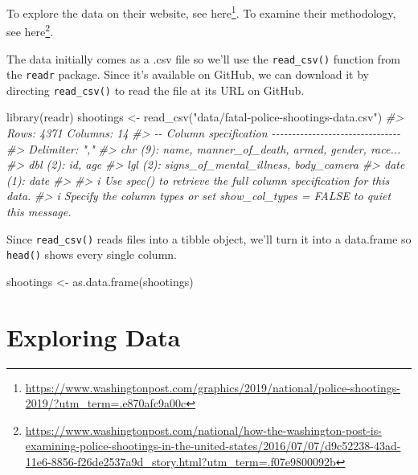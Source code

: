 \documentclass[
]{krantz}
\makeatletter
\newenvironment{Shaded}{\begin{snugshade}}{\end{snugshade}}
\newcommand{\CommentTok}[1]{\textcolor[rgb]{0.37,0.37,0.37}{\textit{#1}}}
\newcommand{\FunctionTok}[1]{\textcolor[rgb]{0,0,0}{#1}}
\newcommand{\NormalTok}[1]{#1}
\newcommand{\OtherTok}[1]{\textcolor[rgb]{0.37,0.37,0.37}{#1}}
\newcommand{\StringTok}[1]{\textcolor[rgb]{0.5,0.5,0.5}{#1}}
\renewcommand{\href}[2]{#2\footnote{\url{#1}}}
\newenvironment{kframe}{%
\medskip{}
\setlength{\fboxsep}{.8em}
 \def\at@end@of@kframe{}%
 \ifinner\ifhmode%
  \def\at@end@of@kframe{\end{minipage}}%
  \begin{minipage}{\columnwidth}%
 \fi\fi%
 \def\FrameCommand##1{\hskip\@totalleftmargin \hskip-\fboxsep
 \colorbox{shadecolor}{##1}\hskip-\fboxsep
     \hskip-\linewidth \hskip-\@totalleftmargin \hskip\columnwidth}%
 \MakeFramed {\advance\hsize-\width
   \@totalleftmargin\z@ \linewidth\hsize
   \@setminipage}}%
 {\par\unskip\endMakeFramed%
 \at@end@of@kframe}
\renewenvironment{Shaded}{\begin{kframe}}{\end{kframe}}
\makeatother
\begin{document}
To explore the data on their website, see \href{https://www.washingtonpost.com/graphics/2019/national/police-shootings-2019/?utm_term=.e870afc9a00c}{here}.
To examine their methodology, see \href{https://www.washingtonpost.com/national/how-the-washington-post-is-examining-police-shootings-in-the-united-states/2016/07/07/d9c52238-43ad-11e6-8856-f26de2537a9d_story.html?utm_term=.f07e9800092b}{here}.

The data initially comes as a .csv file so we'll use the \texttt{read\_csv()} function from the \texttt{readr} package. Since it's available on GitHub, we can download it by directing \texttt{read\_csv()} to read the file at its URL on GitHub.

\begin{Shaded}
\begin{Highlighting}[]
\FunctionTok{library}\NormalTok{(readr)}
\NormalTok{shootings }\OtherTok{\textless{}{-}} \FunctionTok{read\_csv}\NormalTok{(}\StringTok{"data/fatal{-}police{-}shootings{-}data.csv"}\NormalTok{)}
\CommentTok{\#\textgreater{} Rows: 4371 Columns: 14}
\CommentTok{\#\textgreater{} {-}{-} Column specification {-}{-}{-}{-}{-}{-}{-}{-}{-}{-}{-}{-}{-}{-}{-}{-}{-}{-}{-}{-}{-}{-}{-}{-}{-}{-}{-}{-}{-}{-}{-}{-}}
\CommentTok{\#\textgreater{} Delimiter: ","}
\CommentTok{\#\textgreater{} chr  (9): name, manner\_of\_death, armed, gender, race...}
\CommentTok{\#\textgreater{} dbl  (2): id, age}
\CommentTok{\#\textgreater{} lgl  (2): signs\_of\_mental\_illness, body\_camera}
\CommentTok{\#\textgreater{} date (1): date}
\CommentTok{\#\textgreater{} }
\CommentTok{\#\textgreater{} i Use \textasciigrave{}spec()\textasciigrave{} to retrieve the full column specification for this data.}
\CommentTok{\#\textgreater{} i Specify the column types or set \textasciigrave{}show\_col\_types = FALSE\textasciigrave{} to quiet this message.}
\end{Highlighting}
\end{Shaded}

Since \texttt{read\_csv()} reads files into a tibble object, we'll turn it into a data.frame so \texttt{head()} shows every single column.

\begin{Shaded}
\begin{Highlighting}[]
\NormalTok{shootings }\OtherTok{\textless{}{-}} \FunctionTok{as.data.frame}\NormalTok{(shootings)}
\end{Highlighting}
\end{Shaded}

\hypertarget{exploring-data}{%
\section{Exploring Data}\label{exploring-data}}
\end{document}
